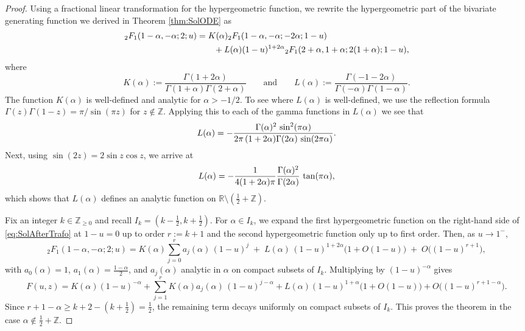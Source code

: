 \documentclass[11pt,a4paper]{article}
\numberwithin{equation}{section}
\def\RR{\mathbb{R}}
\def\ZZ{\mathbb{Z}}
\begin{document}
\begin{proof}
Using a fractional linear transformation
\cite[Eq.~(5.10)]{Temme} for the hypergeometric function, we rewrite the hypergeometric part of the bivariate generating function we derived in Theorem \ref{thm:SolODE} as
\begin{align}\label{eq:SolAfterTrafo}
    \notag{_2F_1}(1-\alpha,-\alpha;2;u) 
    &= K(\alpha) {_2F_1}(1-\alpha,-\alpha;-2\alpha;1-u) \\ 
    &\qquad +
        L(\alpha) (1-u)^{1+2\alpha} {_2F_1}(2+\alpha,1+\alpha;2(1+\alpha);1-u),
\end{align}
where
\begin{equation}\label{def:KandL}
    K(\alpha) := \frac{\Gamma(1+2\alpha)}{\Gamma(1+\alpha)\Gamma(2+\alpha)}\qquad \text{and}\qquad L(\alpha) := \frac{\Gamma(-1-2\alpha)}{\Gamma(-\alpha)\Gamma(1-\alpha)}.
\end{equation}
The function $K(\alpha)$ is well-defined and analytic for $\alpha>-1/2$. To see where $L(\alpha)$ is well-defined, we use the reflection formula $\Gamma(z)\Gamma(1-z)=\pi/\sin(\pi z)$ for $z\notin\mathbb{Z}$. Applying this to each of the gamma functions in $L(\alpha)$ we see that
$$
L(\alpha) = - {\Gamma(\alpha)^2\,\sin^2(\pi \alpha)\over 2\pi\,(1+2\alpha)\Gamma(2\alpha)\,\sin(2\pi\alpha)}.
$$
Next, using $\sin(2z)=2\sin z\cos z$, we arrive at
\begin{equation}\label{eq:Lalternative}
L(\alpha) = -{1\over 4(1+2\alpha)\pi}{\Gamma(\alpha)^2\over\Gamma(2\alpha)}\,\tan(\pi\alpha),
\end{equation}
which shows that $L(\alpha)$ defines an analytic function on $\RR\setminus(\tfrac{1}{2}+\ZZ)$. 

Fix an integer $k\in\ZZ_{\geq 0}$ and recall $I_k=(k-\tfrac{1}{2},k+\tfrac{1}{2})$. For $\alpha\in I_k$, we expand the first hypergeometric function on the right-hand side of \eqref{eq:SolAfterTrafo} at $1-u=0$ up to order $r:=k+1$ and the second hypergeometric function only up to first order. Then, as $u\to1^-$,
\begin{equation*}
    {_2F_1}(1-\alpha,-\alpha;2;u)
    = K(\alpha)\sum_{j=0}^{r} a_j(\alpha)\,(1-u)^j \;+\; L(\alpha)\,(1-u)^{1+2\alpha}\bigl(1+O(1-u)\bigr)
    \;+\; O\bigl((1-u)^{r+1}\bigr),
\end{equation*}
with $a_0(\alpha)=1$, $a_1(\alpha)=\frac{1-\alpha}{2}$, and $a_j(\alpha)$ analytic in $\alpha$ on compact subsets of $I_k$. Multiplying by $(1-u)^{-\alpha}$ gives
\begin{equation*}
    F(u,z)
    = K(\alpha)(1-u)^{-\alpha}
      + \sum_{j=1}^{r} K(\alpha)a_j(\alpha)\,(1-u)^{j-\alpha}
      + L(\alpha)(1-u)^{1+\alpha}\bigl(1+O(1-u)\bigr)
      + O\bigl((1-u)^{r+1-\alpha}\bigr).
\end{equation*}
Since $r+1-\alpha\ge k+2-(k+\tfrac12)=\tfrac12$, the remaining term decays uniformly on compact subsets of $I_k$. This proves the theorem in the case $\alpha\notin\tfrac{1}{2}+\ZZ$.


\end{proof}
\end{document}
